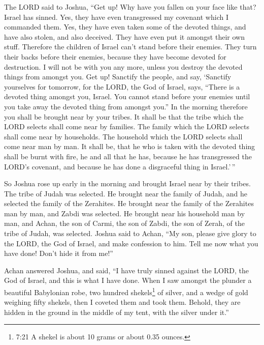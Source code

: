  The LORD said to Joshua, ``Get up! Why have you fallen on
your face like that?  Israel has sinned. Yes, they have
even transgressed my covenant which I commanded them. Yes, they have
even taken some of the devoted things, and have also stolen, and also
deceived. They have even put it amongst their own stuff. 
Therefore the children of Israel can't stand before their enemies. They
turn their backs before their enemies, because they have become devoted
for destruction. I will not be with you any more, unless you destroy the
devoted things from amongst you.  Get up! Sanctify the
people, and say, `Sanctify yourselves for tomorrow, for the LORD, the
God of Israel, says, ``There is a devoted thing amongst you, Israel. You
cannot stand before your enemies until you take away the devoted thing
from amongst you.''  In the morning therefore you shall be
brought near by your tribes. It shall be that the tribe which the LORD
selects shall come near by families. The family which the LORD selects
shall come near by households. The household which the LORD selects
shall come near man by man.  It shall be, that he who is
taken with the devoted thing shall be burnt with fire, he and all that
he has, because he has transgressed the LORD's covenant, and because he
has done a disgraceful thing in Israel.'\,''

 So Joshua rose up early in the morning and brought Israel
near by their tribes. The tribe of Judah was selected.  He
brought near the family of Judah, and he selected the family of the
Zerahites. He brought near the family of the Zerahites man by man, and
Zabdi was selected.  He brought near his household man by
man, and Achan, the son of Carmi, the son of Zabdi, the son of Zerah, of
the tribe of Judah, was selected.  Joshua said to Achan,
``My son, please give glory to the LORD, the God of Israel, and make
confession to him. Tell me now what you have done! Don't hide it from
me!''

 Achan answered Joshua, and said, ``I have truly sinned
against the LORD, the God of Israel, and this is what I have done.
 When I saw amongst the plunder a beautiful Babylonian
robe, two hundred shekels\footnote{7:21 A shekel is about 10 grams or
  about 0.35 ounces.} of silver, and a wedge of gold weighing fifty
shekels, then I coveted them and took them. Behold, they are hidden in
the ground in the middle of my tent, with the silver under it.''

